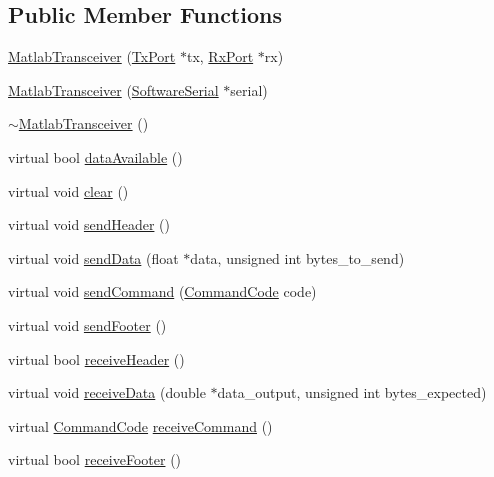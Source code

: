 \subsection*{Public Member Functions}
\begin{DoxyCompactItemize}
\item 
\hyperlink{classMatlabTransceiver_ae3855410a8eefe030216c091213b93e1}{Matlab\+Transceiver} (\hyperlink{classTxPort}{Tx\+Port} $\ast$tx, \hyperlink{classRxPort}{Rx\+Port} $\ast$rx)
\item 
\hyperlink{classMatlabTransceiver_a0e4f005ea7c7248f554dd59196dc6bff}{Matlab\+Transceiver} (\hyperlink{classSoftwareSerial}{Software\+Serial} $\ast$serial)
\item 
\hyperlink{classMatlabTransceiver_a2f0913eafbbbc54e962a9d0a439be83c}{$\sim$\+Matlab\+Transceiver} ()
\item 
virtual bool \hyperlink{classMatlabTransceiver_aab65545ebfde63124bf8a9da08087a1a}{data\+Available} ()
\item 
virtual void \hyperlink{classMatlabTransceiver_a34cd6eceff55dc5b05cfa8a8a61817c8}{clear} ()
\item 
virtual void \hyperlink{classMatlabTransceiver_a4983e5511e1aa32bedc2e1c5e4a0a015}{send\+Header} ()
\item 
virtual void \hyperlink{classMatlabTransceiver_a6b2525e36d52c55c23e67b4bfc5220f3}{send\+Data} (float $\ast$data, unsigned int bytes\+\_\+to\+\_\+send)
\item 
virtual void \hyperlink{classMatlabTransceiver_ad3ec15346a7e93d65ea2da6f7cda15ef}{send\+Command} (\hyperlink{Command__Codes_8hpp_a59210a0ae0b431bbcaba126ab960fd62}{Command\+Code} code)
\item 
virtual void \hyperlink{classMatlabTransceiver_a578396f6e3596252f778f287338d05e6}{send\+Footer} ()
\item 
virtual bool \hyperlink{classMatlabTransceiver_a1bc60b8fdb7ae0447c91a92947e678fa}{receive\+Header} ()
\item 
virtual void \hyperlink{classMatlabTransceiver_a42551825e635b70c0db97a30f09fd70a}{receive\+Data} (double $\ast$data\+\_\+output, unsigned int bytes\+\_\+expected)
\item 
virtual \hyperlink{Command__Codes_8hpp_a59210a0ae0b431bbcaba126ab960fd62}{Command\+Code} \hyperlink{classMatlabTransceiver_aed9f05e71df966ec2840750e4f6e76c7}{receive\+Command} ()
\item 
virtual bool \hyperlink{classMatlabTransceiver_a9089a8e457ffab33eb17ecec2d76152b}{receive\+Footer} ()
\end{DoxyCompactItemize}
